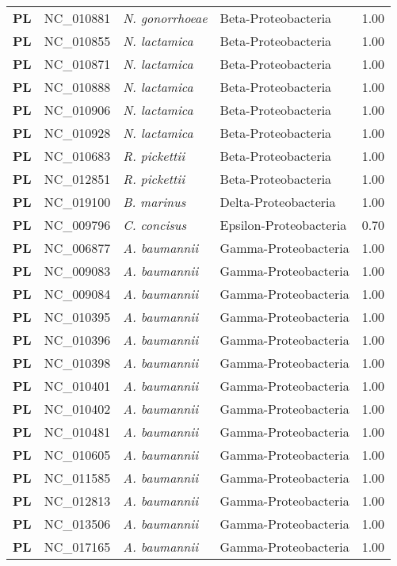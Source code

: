 \begin{adjustwidth}{-3cm}{2cm}
{\begin{supertabular}{>{\bfseries}l|p{0.1\textwidth}p{0.14\textwidth}l|l}
PL & NC\_010881 & \textit{N. gonorrhoeae} & Beta-Proteobacteria & 1.00\\
PL & NC\_010855 & \textit{N. lactamica} & Beta-Proteobacteria & 1.00\\
PL & NC\_010871 & \textit{N. lactamica} & Beta-Proteobacteria & 1.00\\
PL & NC\_010888 & \textit{N. lactamica} & Beta-Proteobacteria & 1.00\\
PL & NC\_010906 & \textit{N. lactamica} & Beta-Proteobacteria & 1.00\\
PL & NC\_010928 & \textit{N. lactamica} & Beta-Proteobacteria & 1.00\\
PL & NC\_010683 & \textit{R. pickettii} & Beta-Proteobacteria & 1.00\\
PL & NC\_012851 & \textit{R. pickettii} & Beta-Proteobacteria & 1.00\\
PL & NC\_019100 & \textit{B. marinus} & Delta-Proteobacteria & 1.00\\
PL & NC\_009796 & \textit{C. concisus} & Epsilon-Proteobacteria & 0.70\\
PL & NC\_006877 & \textit{A. baumannii} & Gamma-Proteobacteria & 1.00\\
PL & NC\_009083 & \textit{A. baumannii} & Gamma-Proteobacteria & 1.00\\
PL & NC\_009084 & \textit{A. baumannii} & Gamma-Proteobacteria & 1.00\\
PL & NC\_010395 & \textit{A. baumannii} & Gamma-Proteobacteria & 1.00\\
PL & NC\_010396 & \textit{A. baumannii} & Gamma-Proteobacteria & 1.00\\
PL & NC\_010398 & \textit{A. baumannii} & Gamma-Proteobacteria & 1.00\\
PL & NC\_010401 & \textit{A. baumannii} & Gamma-Proteobacteria & 1.00\\
PL & NC\_010402 & \textit{A. baumannii} & Gamma-Proteobacteria & 1.00\\
PL & NC\_010481 & \textit{A. baumannii} & Gamma-Proteobacteria & 1.00\\
PL & NC\_010605 & \textit{A. baumannii} & Gamma-Proteobacteria & 1.00\\
PL & NC\_011585 & \textit{A. baumannii} & Gamma-Proteobacteria & 1.00\\
PL & NC\_012813 & \textit{A. baumannii} & Gamma-Proteobacteria & 1.00\\
PL & NC\_013506 & \textit{A. baumannii} & Gamma-Proteobacteria & 1.00\\
PL & NC\_017165 & \textit{A. baumannii} & Gamma-Proteobacteria & 1.00\\

\end{supertabular}}
\end{adjustwidth}
